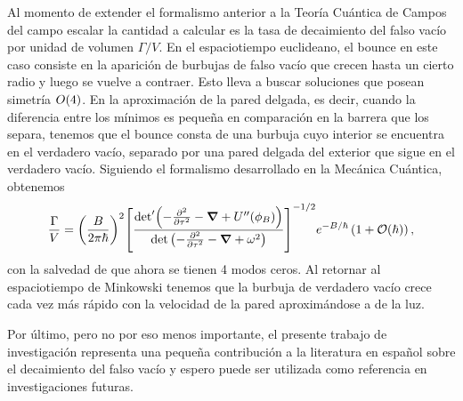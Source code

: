 Al momento de extender el formalismo anterior a la Teoría Cuántica de Campos del campo escalar la cantidad a calcular es la tasa de decaimiento del falso vacío por unidad de volumen $\Gamma/V$. En el espaciotiempo euclideano, el bounce en este caso consiste en la aparición de burbujas de falso vacío que crecen hasta un cierto radio y luego se vuelve a contraer. Esto lleva a buscar soluciones que posean simetría $O\qty(4)$. En la aproximación de la pared delgada, es decir, cuando la diferencia entre los mínimos es pequeña en comparación en la barrera que los separa, tenemos que el bounce consta de una burbuja cuyo interior se encuentra en el verdadero vacío, separado por una pared delgada del exterior que sigue en el verdadero vacío. Siguiendo el formalismo desarrollado en la Mecánica Cuántica, obtenemos 
\begin{equation}
\frac{\Gamma}{V} = \qty(\frac{B}{2\pi\hbar})^2  \qty[ \frac{\textrm{det}' \qty(-\pdv[2]{\tau} -\grad{} + U''\qty(\phi_B) )}{\det \qty(-\pdv[2]{\tau} -\grad{} + \omega^2 )} ]^{-1/2}e^{-B/\hbar}\left( 1 + \mathcal{O}(\hbar)\right),
\end{equation}
con la salvedad de que ahora se tienen 4 modos ceros. Al retornar al espaciotiempo de Minkowski tenemos que la burbuja de verdadero vacío crece cada vez más rápido con la velocidad de la pared aproximándose a de la luz. 

Por último, pero no por eso menos importante, el presente trabajo de investigación representa una pequeña contribución a la literatura en español sobre el decaimiento del falso vacío y espero puede ser utilizada como referencia en investigaciones futuras. 